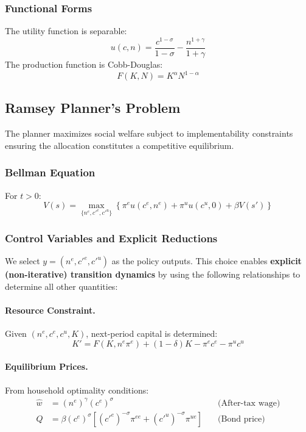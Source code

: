 \subsubsection{Functional Forms}
The utility function is separable:
\begin{equation}
    u(c, n) = \frac{c^{1-\sigma}}{1-\sigma} - \frac{n^{1+\gamma}}{1+\gamma}
\end{equation}
The production function is Cobb-Douglas:
\begin{equation}
    F(K, N) = K^\alpha N^{1-\alpha}
\end{equation}


\subsection{Ramsey Planner's Problem}

The planner maximizes social welfare subject to implementability constraints ensuring the allocation constitutes a competitive equilibrium.

\subsubsection{Bellman Equation}
For $t > 0$:
\begin{equation}\label{eq:bellman_ha}
    V(s) = \max_{\{n^e, c'^e, c'^u\}} \left\{ \pi^e u(c^e, n^e) + \pi^u u(c^u, 0) + \beta V(s') \right\}
\end{equation}

\subsubsection{Control Variables and Explicit Reductions}
We select $y = (n^e, c'^e, c'^u)$ as the policy outputs. This choice enables \textbf{explicit (non-iterative) transition dynamics} by using the following relationships to determine all other quantities:

\paragraph{Resource Constraint.}
Given $(n^e, c^e, c^u, K)$, next-period capital is determined:
\begin{equation}\label{eq:resource_ha}
    K' = F(K, n^e \pi^e) + (1-\delta)K - \pi^e c^e - \pi^u c^u
\end{equation}

\paragraph{Equilibrium Prices.}
From household optimality conditions:
\begin{align}
    \hat{w} &= (n^e)^\gamma (c^e)^\sigma \quad &\text{(After-tax wage)} \label{eq:wage_ha}\\
    Q &= \beta (c^e)^\sigma \left[ (c'^e)^{-\sigma} \pi^{ee} + (c'^u)^{-\sigma} \pi^{ue} \right] \quad &\text{(Bond price)} \label{eq:bondprice_ha}
\end{align}

